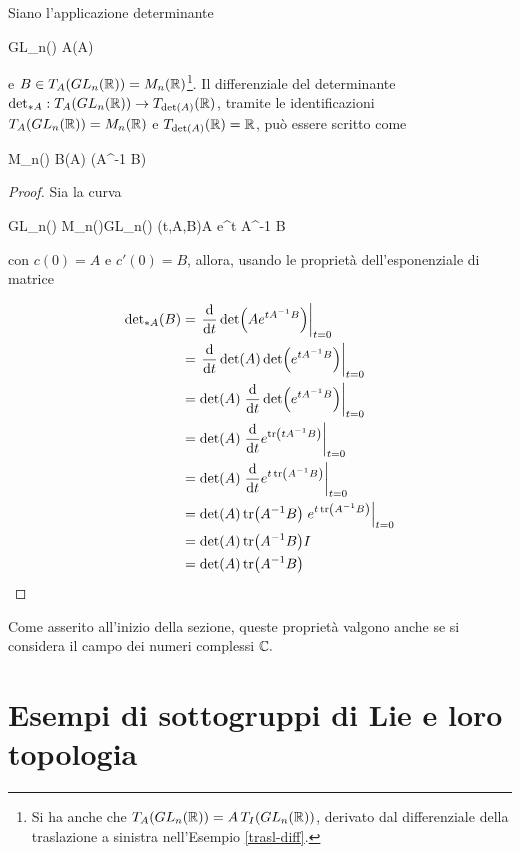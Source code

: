 \begin{corollary}
	Siano l'applicazione determinante
	
	\map{\det}%
		{GL_{n}(\R)}{\R}%
		{A}{\det(A)}
		
	e $ B \in T_{A}(GL_{n}(\mathbb{R})) = M_{n}(\mathbb{R}) $\footnote{%
		Si ha anche che $ T_{A}(GL_{n}(\mathbb{R})) = A \, T_{I}(GL_{n}(\mathbb{R})) $, derivato dal differenziale della traslazione a sinistra nell'Esempio \ref{trasl-diff}.%
	}. Il differenziale del determinante $ \det_{*A} : T_{A}(GL_{n}(\mathbb{R})) \to T_{\det(A)}(\mathbb{R}) $, tramite le identificazioni $  T_{A}(GL_{n}(\mathbb{R})) = M_{n}(\mathbb{R}) $ e $ T_{\det(A)}(\mathbb{R}) = \mathbb{R} $, può essere scritto come

		{M_{n}(\R)}{\R}%
		{B}{\det(A) \tr(A^{-1} B)}
\end{corollary}

\begin{proof}
	Sia la curva
	
	\map{c}%
		{\R \times GL_{n}(\R) \times M_{n}(\R)}{GL_{n}(\R)}%
		{(t,A,B)}{A e^{t A^{-1} B}}
	
	con $ c(0) = A $ e $ c'(0) = B $, allora, usando le proprietà dell'esponenziale di matrice
	
	\begin{align}
		\begin{split}
			\operatorname{det}_{*A}(B) &= \left. \dv{t} \det(A e^{t A^{-1} B}) \right|_{t=0}\\
			&= \left. \dv{t} \det(A) \det(e^{t A^{-1} B}) \right|_{t=0}\\
			&= \det(A) \left. \dv{t} \det(e^{t A^{-1} B}) \right|_{t=0}\\
			&= \det(A) \left. \dv{t} e^{\tr(t A^{-1} B)} \right|_{t=0}\\
			&= \det(A) \left. \dv{t} e^{t \tr(A^{-1} B)} \right|_{t=0}\\
			&= \det(A) \tr(A^{-1} B) \left. e^{t \tr(A^{-1} B)} \right|_{t=0}\\
			&= \det(A) \tr(A^{-1} B) I\\
			&= \det(A) \tr(A^{-1} B)
		\end{split}
	\end{align}
\end{proof}

Come asserito all'inizio della sezione, queste proprietà valgono anche se si considera il campo dei numeri complessi $ \mathbb{C}. $

\section{Esempi di sottogruppi di Lie e loro topologia}

